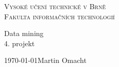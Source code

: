 \documentclass[11pt,a4paper,twocolumn]{article}
\begin{document}
	\begin{titlepage}
		\begin{center}
			\Huge
			\textsc{Vysoké učení technické v Brně\\[-2mm]
				\huge Fakulta informačních technologií}
			
			
			\LARGE
			{\huge Data mining }\\4. projekt
		\end{center}
		{\Large \today \hfill Martin Omacht}
	\end{titlepage}
\end{document}
